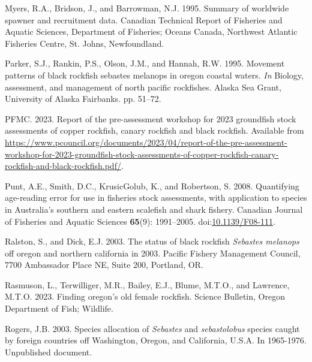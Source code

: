 \documentclass[11pt,
  english,
  letterpaper,
]{article}
\newlength{\cslhangindent}
\newenvironment{CSLReferences}[2] %
 {%
  \setlength{\parindent}{0pt}
  \ifodd #1 \everypar{\setlength{\hangindent}{\cslhangindent}}\ignorespaces\fi
  \ifnum #2 > 0
  \setlength{\parskip}{#2\baselineskip}
  \fi
 }%
 {}
\begin{document}
\begin{CSLReferences}{1}{0}
\leavevmode{}%
Myers, R.A., Bridson, J., and Barrowman, N.J. 1995. Summary of worldwide spawner and recruitment data. Canadian Technical Report of Fisheries and Aquatic Sciences, Department of Fisheries; Oceans Canada, Northwest Atlantic Fisheries Centre, St. Johns, Newfoundland.

\leavevmode{}%
Parker, S.J., Rankin, P.S., Olson, J.M., and Hannah, R.W. 1995. Movement patterns of black rockfish sebastes melanops in oregon coastal waters. \emph{In} Biology, assessment, and management of north pacific rockfishes. Alaska Sea Grant, University of Alaska Fairbanks. pp. 51--72.

\leavevmode{}%
PFMC. 2023. Report of the pre-assessment workshop for 2023 groundfish stock assessments of copper rockfish, canary rockfish and black rockfish. Available from \url{https://www.pcouncil.org/documents/2023/04/report-of-the-pre-assessment-workshop-for-2023-groundfish-stock-assessments-of-copper-rockfish-canary-rockfish-and-black-rockfish.pdf/}.

\leavevmode{}%
Punt, A.E., Smith, D.C., KrusicGolub, K., and Robertson, S. 2008. Quantifying age-reading error for use in fisheries stock assessments, with application to species in {A}ustralia's southern and eastern scalefish and shark fishery. Canadian Journal of Fisheries and Aquatic Sciences \textbf{65}(9): 1991--2005. doi:\href{https://doi.org/10.1139/F08-111}{10.1139/F08-111}.

\leavevmode{}%
Ralston, S., and Dick, E.J. 2003. The status of black rockfish \emph{{Sebastes} melanops} off oregon and northern california in 2003. Pacific Fishery Management Council, 7700 Ambassador Place NE, Suite 200, Portland, OR.

\leavevmode{}%
Rasmuson, L., Terwilliger, M.R., Bailey, E.J., Blume, M.T.O., and Lawrence, M.T.O. 2023. Finding oregon's old female rockfish. Science Bulletin, Oregon Department of Fish; Wildlife.

\leavevmode{}%
Rogers, J.B. 2003. Species allocation of \emph{{Sebastes}} and \emph{sebastolobus} species caught by foreign countries off {Washington}, {Oregon}, and {California}, {U}.{S}.{A}. In 1965-1976. Unpublished document.


\end{CSLReferences}
\end{document}
